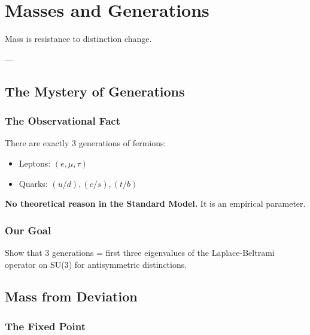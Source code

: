 
\chapter{Masses and Generations}\label{ch:masses}

\epigraph{Mass is resistance to distinction change.}{---}


\section{The Mystery of Generations}

\subsection{The Observational Fact}

There are exactly 3 generations of fermions:
\begin{itemize}
    \item Leptons: $(e, \mu, \tau)$
    \item Quarks: $(u/d), (c/s), (t/b)$
\end{itemize}

\textbf{No theoretical reason in the Standard Model.} It is an empirical parameter.

\subsection{Our Goal}

Show that 3 generations = first three eigenvalues of the Laplace-Beltrami operator on SU(3) for antisymmetric distinctions.

\section{Mass from Deviation}

\subsection{The Fixed Point}

